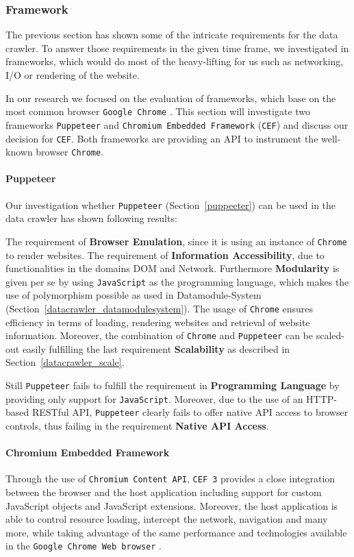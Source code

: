 \subsubsection{Framework}
\label{datacrawler_framework_language}
The previous section has shown some of the intricate requirements for the data crawler. To answer those requirements in the given time frame, we investigated in frameworks, which would do most of the heavy-lifting for us such as networking, I/O or rendering of the website.

In our research we focused on the evaluation of frameworks, which base on the most common browser \texttt{Google Chrome} \cite{CommonBrowsers}. This section will investigate two frameworks \texttt{Puppeteer} and \texttt{Chromium Embedded Framework} (\texttt{CEF}) and discuss our decision for \texttt{CEF}. Both frameworks are providing an API to instrument the well-known browser \texttt{Chrome}.

\paragraph*{Puppeteer}
Our investigation whether \texttt{Puppeteer} (Section~\ref{puppeeter}) can be used in the data crawler has shown following results:

The requirement of \textbf{Browser Emulation}, since it is using an instance of \texttt{Chrome} to render websites. The requirement of \textbf{Information Accessibility}, due to functionalities in the domains DOM and Network. Furthermore \textbf{Modularity} is given per se by using \texttt{JavaScript} as the programming language, which makes the use of polymorphism possible as used in Datamodule-System (Section~\ref{datacrawler_datamodulesystem}). The usage of \texttt{Chrome} ensures efficiency in terms of loading, rendering websites and retrieval of website information. Moreover, the combination of \texttt{Chrome} and \texttt{Puppeteer} can be scaled-out easily fulfilling the last requirement \textbf{Scalability} as described in Section~\ref{datacrawler_scale}.

Still \texttt{Puppeteer} fails to fulfill the requirement in \textbf{Programming Language } by providing only support for \texttt{JavaScript}. Moreover, due to the use of an HTTP-based RESTful API, \texttt{Puppeteer} clearly fails to offer native API access to browser controls, thus failing in the requirement \textbf{Native API Access}. 

\paragraph*{Chromium Embedded Framework}
Through the use of \texttt{Chromium Content API}, \texttt{CEF 3} provides a close integration between the browser and the host application including support for custom JavaScript objects and JavaScript extensions. Moreover, the host application is able to control resource loading, intercept the network, navigation and many more, while taking advantage of the same performance and technologies available in the \texttt{Google Chrome Web browser} \cite{CEFGeneralUsage}.

